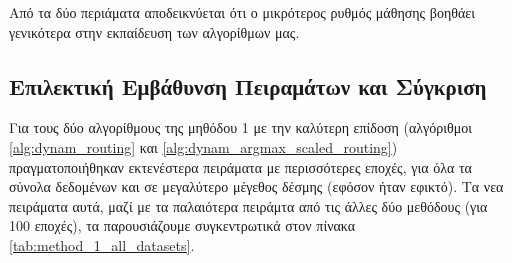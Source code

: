 \begin{table}[h]
    \begin{center}
    \end{center}
    \caption[]{\label{tab:method_1_hyperparameter_tuning_cifar10_alg4}Πειράματα στο  για την αναζήτηση υπερπαραμέτρων στον αλγόριθμο  (αλγόριθμος \ref{alg:dynam_max_routing}) για 30 εποχές.}
\end{table}

Από τα δύο περιάματα αποδεικνύεται ότι ο μικρότερος ρυθμός μάθησης βοηθάει γενικότερα στην εκπαίδευση των αλγορίθμων μας.


\subsection{Επιλεκτική Εμβάθυνση Πειραμάτων και Σύγκριση}
Για τους δύο αλγορίθμους της μηθόδου 1 με την καλύτερη επίδοση (αλγόριθμοι \ref{alg:dynam_routing} και \ref{alg:dynam_argmax_scaled_routing}) πραγματοποιήθηκαν εκτενέστερα πειράματα με περισσότερες εποχές, για όλα τα σύνολα δεδομένων και σε μεγαλύτερο μέγεθος δέσμης (εφόσον ήταν εφικτό). Τα νεα πειράματα αυτά, μαζί με τα παλαιότερα πειράμτα από τις άλλες δύο μεθόδους (για 100 εποχές), τα παρουσιάζουμε συγκεντρωτικά στον πίνακα \ref{tab:method_1_all_datasets}.

